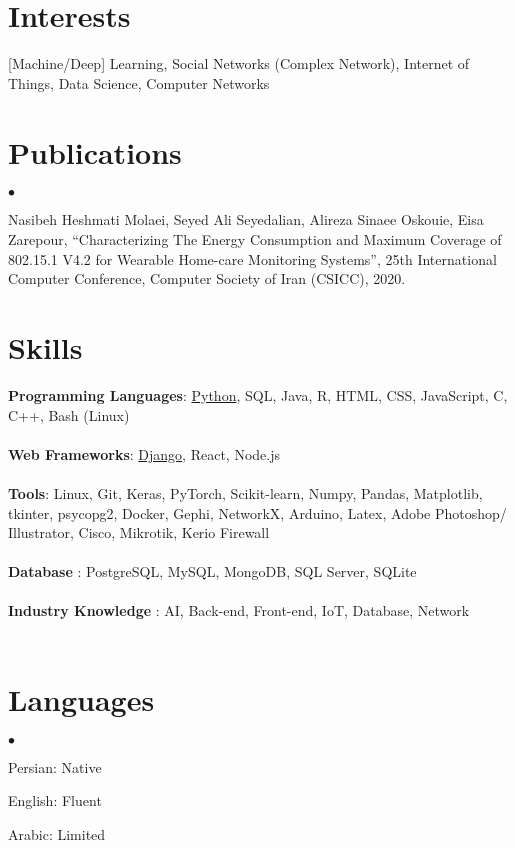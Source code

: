 \documentclass[margin,line]{res}
\newenvironment{list2}{
  \begin{list}{$\bullet$}{%
      \setlength{\itemsep}{0in}
      \setlength{\parsep}{0in} \setlength{\parskip}{0in}
      \setlength{\topsep}{0in} \setlength{\partopsep}{0in}
      \setlength{\leftmargin}{0.2in}}}{\end{list}}
\begin{document}
\begin{resume}
\section{\sc Interests}
[Machine/Deep] Learning, Social Networks (Complex Network),  Internet of Things, Data Science, Computer Networks
\section{\sc Publications}
\begin{list2}
	\item Nasibeh Heshmati Molaei, Seyed Ali Seyedalian, Alireza Sinaee Oskouie, Eisa Zarepour, “Characterizing
	The Energy Consumption and Maximum Coverage of 802.15.1 V4.2 for Wearable Home-care Monitoring
	Systems”, 25th International Computer Conference, Computer Society of Iran (CSICC), 2020.
\end{list2}

\section{\sc Skills}
{\bf Programming  Languages}:  
\underline{Python}, SQL, Java, R, HTML, CSS, JavaScript, C, C++, Bash (Linux)\\ \\ 
{\bf Web Frameworks}: 
\underline{Django}, React, Node.js\\ \\
{\bf Tools}: 
Linux, Git, Keras, PyTorch, Scikit-learn, Numpy, Pandas, Matplotlib, tkinter, psycopg2, Docker,  Gephi, NetworkX, Arduino,  Latex, Adobe Photoshop/ Illustrator, Cisco, Mikrotik, Kerio Firewall \\ \\
{\bf Database }: PostgreSQL, MySQL, MongoDB, SQL Server, SQLite \\ \\ 
{\bf Industry Knowledge} : AI, Back-end, Front-end, IoT, Database, Network \\ \\
\section{\sc Languages}
\begin{list2} 
	\item  Persian: Native 
	\item English: Fluent
	\item Arabic: Limited 
\end{list2}


\end{resume}
\end{document}
